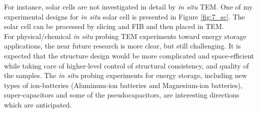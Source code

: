 For instance, solar cells are not investigated in detail by \textit{in situ} TEM. One of my experimental designs for \textit{in situ} solar cell is presented in Figure \ref{fig:7_sc}. The solar cell can be processed by slicing and FIB and then placed in TEM. \\ 

For physical/chemical \textit{in situ} probing TEM experiments toward energy storage applications, the near future research is more clear, but still challenging. It is expected that the structure design would be more complicated and space-efficient while taking care of higher-level control of structural consistency, and quality of the samples. The \textit{in situ} probing experiments for energy storage, including new types of ion-batteries (Aluminum-ion batteries and Magnesium-ion batteries), super-capacitors and some of the pseudocapacitors, are interesting directions which are anticipated. 

